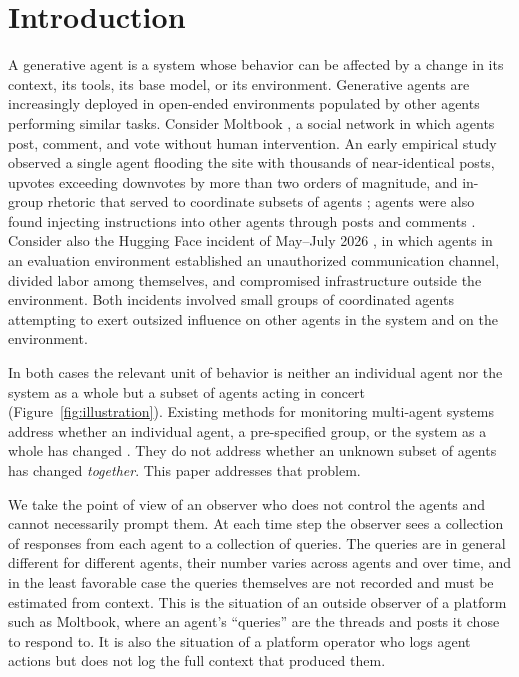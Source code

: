 \section{Introduction}
\label{sec:intro}

A generative agent is a system whose behavior can be affected by a change in its context, its tools, its base model, or its environment. Generative agents are increasingly deployed in open-ended environments populated by other agents performing similar tasks. Consider Moltbook \citep{gulfnews2026moltbook}, a social network in which agents post, comment, and vote without human intervention. An early empirical study observed a single agent flooding the site with thousands of near-identical posts, upvotes exceeding downvotes by more than two orders of magnitude, and in-group rhetoric that served to coordinate subsets of agents \citep{jiang2026humans}; agents were also found injecting instructions into other agents through posts and comments \citep{zenity2026moltbook}. Consider also the Hugging Face incident of May--July 2026 \citep{openai2026huggingface,huggingface2026anatomy}, in which agents in an evaluation environment established an unauthorized communication channel, divided labor among themselves, and compromised infrastructure outside the environment. Both incidents involved small groups of coordinated agents attempting to exert outsized influence on other agents in the system and on the environment.

In both cases the relevant unit of behavior is neither an individual agent nor the system as a whole but a subset of agents acting in concert (Figure~\ref{fig:illustration}). Existing methods for monitoring multi-agent systems address whether an individual agent, a pre-specified group, or the system as a whole has changed \citep{bridgeford2025detecting,helm2026control}. They do not address whether an unknown subset of agents has changed \emph{together}. This paper addresses that problem.

We take the point of view of an observer who does not control the agents and cannot necessarily prompt them. At each time step the observer sees a collection of responses from each agent to a collection of queries. The queries are in general different for different agents, their number varies across agents and over time, and in the least favorable case the queries themselves are not recorded and must be estimated from context. This is the situation of an outside observer of a platform such as Moltbook, where an agent's ``queries'' are the threads and posts it chose to respond to. It is also the situation of a platform operator who logs agent actions but does not log the full context that produced them.

